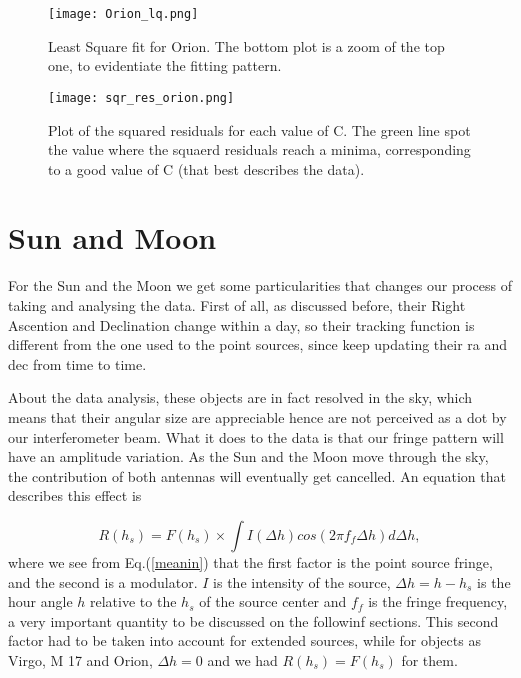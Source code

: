\documentclass{article}
\begin{document}
\begin{figure}[H]
\center
\texttt{[image: Orion\_lq.png]}
\caption {Least Square fit for Orion. The bottom plot is a zoom of the
  top one, to evidentiate the fitting pattern.} 
\label{m17}
\end{figure}

\begin{figure}[H]
\center
\texttt{[image: sqr\_res\_orion.png]}
\caption {Plot of the squared residuals for each value of C. The green
  line spot the value where the squaerd residuals reach a minima,
  corresponding to a good value of C (that best describes the data).} 
\label{m17}
\end{figure}

\section{Sun and Moon}

For the Sun and the Moon we get some particularities that changes our
process of taking and analysing the data. First of all, as discussed
before, their Right Ascention and Declination change within a day, so
their tracking function is different from the one used to the point
sources, since keep updating their ra and dec from time to time. 

About the data analysis, these objects are in fact resolved in the sky,
which means that their angular size are appreciable hence are not perceived
as a dot by our interferometer beam. What it does to the data is that
our fringe pattern will have an amplitude variation. As
the Sun and the Moon move through the sky, the contribution of both
antennas will eventually get cancelled. An equation that describes this
effect is 

\begin{equation}
R(h_{s})=F(h_{s}) \times \int I(\Delta h)cos(2 \pi f_{f} \Delta h)
d\Delta h,
\label{mod}
\end{equation} 
where we see from Eq.(\ref{meanin}) that the first factor is the point
source fringe, and the second is a modulator. $I$ is the intensity of
the source, $\Delta h = h - h_{s}$ is the hour angle $h$ relative to the
$h_{s}$ of the source center and $f_{f}$ is the fringe frequency, a very
important quantity to be discussed on the followinf sections. 
This second factor had to be taken into account for
extended sources, while for objects as Virgo, M 17 and Orion, $\Delta h
=0$ and we had $R(h_{s}) = F(h_{s})$ for them. 
\end{document}
